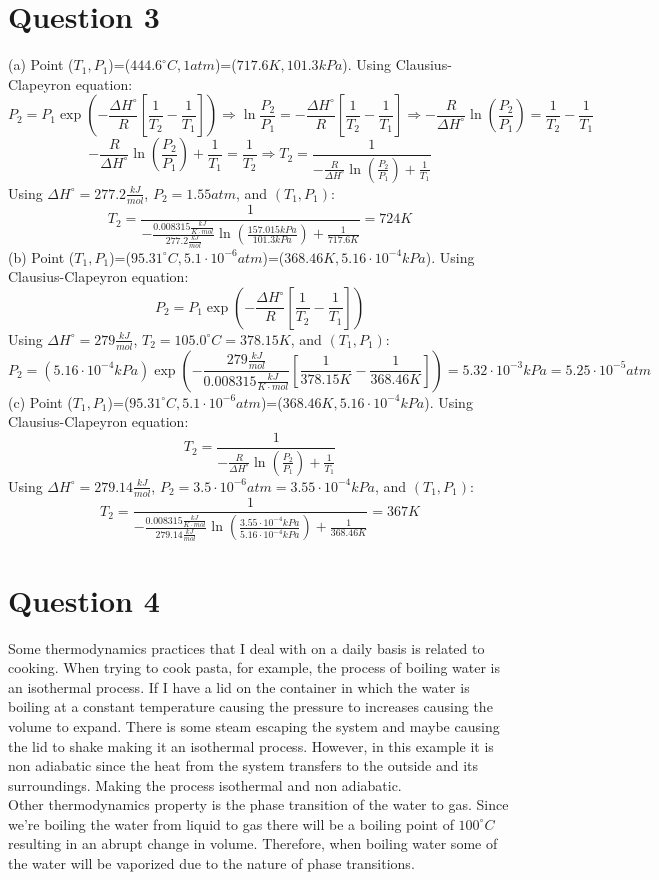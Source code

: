 \documentclass[11pt]{article}
\begin{document}
\section*{Question 3}
(a) Point ($T_1,P_1$)=($444.6^\circ C, 1atm$)=($717.6 K, 101.3 kPa$). Using Clausius-Clapeyron equation:
\[P_2=P_1\exp{(-\frac{\Delta H^\circ}{R}[\frac{1}{T_2}-\frac{1}{T_1}])} \Rightarrow \ln{\frac{P_2}{P_1}}=-\frac{\Delta H^\circ}{R}[\frac{1}{T_2}-\frac{1}{T_1}] \Rightarrow -\frac{R}{\Delta H^\circ}\ln({\frac{P_2}{P_1}})=\frac{1}{T_2}-\frac{1}{T_1}\] 
\[-\frac{R}{\Delta H^\circ}\ln({\frac{P_2}{P_1}})+\frac{1}{T_1}=\frac{1}{T_2} \Rightarrow T_2=\frac{1}{-\frac{R}{\Delta H^\circ}\ln({\frac{P_2}{P_1}})+\frac{1}{T_1}}\]
Using $\Delta H^\circ= 277.2 \frac{kJ}{mol}$, $P_2=1.55 atm$, and $(T_1,P_1)$:
\[T_2=\frac{1}{-\frac{0.008315\frac{kJ}{K\cdot mol}}{277.2 \frac{kJ}{mol}}\ln({\frac{157.015kPa}{101.3kPa}})+\frac{1}{717.6K}}=724 K\]
(b) Point ($T_1,P_1$)=($95.31^\circ C, 5.1\cdot 10^{-6}atm$)=($368.46K,5.16\cdot 10^{-4} kPa$). Using Clausius-Clapeyron equation:
\[P_2=P_1\exp{(-\frac{\Delta H^\circ}{R}[\frac{1}{T_2}-\frac{1}{T_1}])}\]
Using $\Delta H^\circ= 279 \frac{kJ}{mol}$, $T_2=105.0^\circ C= 378.15K$, and $(T_1,P_1)$:
\[P_2=(5.16\cdot 10^{-4}kPa)\exp{(-\frac{279\frac{kJ}{mol}}{0.008315\frac{kJ}{K\cdot mol}}[\frac{1}{378.15K}-\frac{1}{368.46K}])}=5.32\cdot 10^{-3}kPa=5.25\cdot 10^{-5} atm\]
\newpage
\noindent (c) Point ($T_1,P_1$)=($95.31^\circ C, 5.1\cdot 10^{-6}atm$)=($368.46K,5.16\cdot 10^{-4} kPa$). Using Clausius-Clapeyron equation:
\[T_2=\frac{1}{-\frac{R}{\Delta H^\circ}\ln({\frac{P_2}{P_1}})+\frac{1}{T_1}}\]
Using $\Delta H^\circ= 279.14 \frac{kJ}{mol}$, $P_2=3.5\cdot10^{-6} atm= 3.55\cdot10^{-4}kPa$, and $(T_1,P_1)$:
\[T_2=\frac{1}{-\frac{0.008315\frac{kJ}{K\cdot mol}}{279.14\frac{kJ}{mol}}\ln({\frac{3.55\cdot10^{-4}kPa}{5.16\cdot10^{-4}kPa}})+\frac{1}{368.46K}}=367 K\]

\section*{Question 4}
Some thermodynamics practices that I deal with on a daily basis is related to cooking. When trying to cook pasta, for example, the process of boiling water is an isothermal process. If I have a lid on the container in which the water is boiling at a constant temperature causing the pressure to increases causing the volume to expand. There is some steam escaping the system and maybe causing the lid to shake making it an isothermal process. However, in this example it is non adiabatic since the heat from the system transfers to the outside and its surroundings. Making the process isothermal and non adiabatic.\\
Other thermodynamics property is the phase transition of the water to gas. Since we're boiling the water from liquid to gas there will be a boiling point of $100^\circ C$ resulting in an abrupt change in volume. Therefore, when boiling water some of the water will be vaporized due to the nature of phase transitions. 
\end{document}
